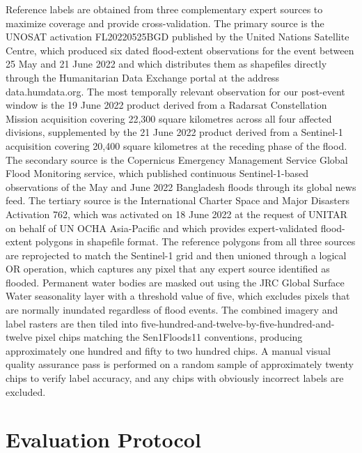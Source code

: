\documentclass[11pt,a4paper,oneside]{report}
\begin{document}
Reference labels are obtained from three complementary expert sources to maximize coverage and provide cross-validation. The primary source is the UNOSAT activation FL20220525BGD published by the United Nations Satellite Centre, which produced six dated flood-extent observations for the event between 25 May and 21 June 2022 and which distributes them as shapefiles directly through the Humanitarian Data Exchange portal at the address data.humdata.org. The most temporally relevant observation for our post-event window is the 19 June 2022 product derived from a Radarsat Constellation Mission acquisition covering 22,300 square kilometres across all four affected divisions, supplemented by the 21 June 2022 product derived from a Sentinel-1 acquisition covering 20,400 square kilometres at the receding phase of the flood. The secondary source is the Copernicus Emergency Management Service Global Flood Monitoring service, which published continuous Sentinel-1-based observations of the May and June 2022 Bangladesh floods through its global news feed. The tertiary source is the International Charter Space and Major Disasters Activation 762, which was activated on 18 June 2022 at the request of UNITAR on behalf of UN OCHA Asia-Pacific and which provides expert-validated flood-extent polygons in shapefile format. The reference polygons from all three sources are reprojected to match the Sentinel-1 grid and then unioned through a logical OR operation, which captures any pixel that any expert source identified as flooded. Permanent water bodies are masked out using the JRC Global Surface Water seasonality layer with a threshold value of five, which excludes pixels that are normally inundated regardless of flood events. The combined imagery and label rasters are then tiled into five-hundred-and-twelve-by-five-hundred-and-twelve pixel chips matching the Sen1Floods11 conventions, producing approximately one hundred and fifty to two hundred chips. A manual visual quality assurance pass is performed on a random sample of approximately twenty chips to verify label accuracy, and any chips with obviously incorrect labels are excluded.

\section{Evaluation Protocol}
\end{document}
